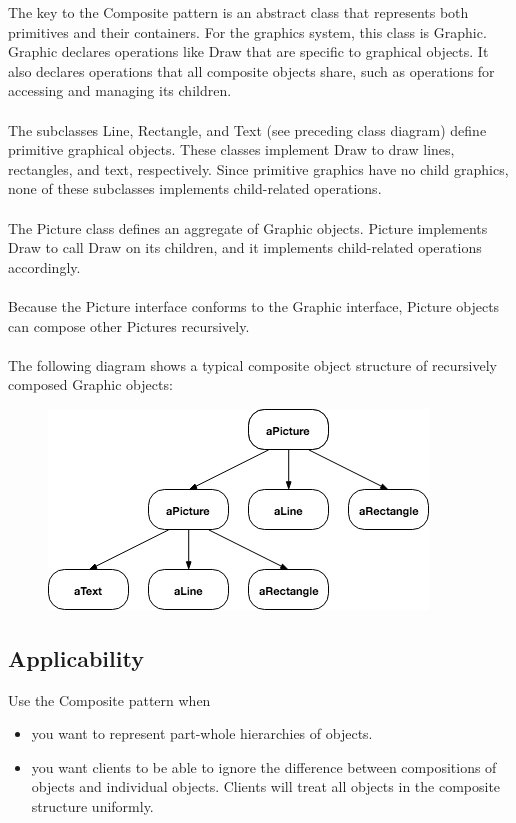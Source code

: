 The key to the Composite pattern is an abstract class that represents both primitives and their containers. For the graphics system, this class is Graphic. Graphic declares operations like Draw that are specific to graphical objects. It also declares operations that all composite objects share, such as operations for accessing and managing its children.
\\\\
The subclasses Line, Rectangle, and Text (see preceding class diagram) define primitive graphical objects. These classes implement Draw to draw lines, rectangles, and text, respectively. Since primitive graphics have no child graphics, none of these subclasses implements child-related operations.
\\\\
The Picture class defines an aggregate of Graphic objects. Picture implements Draw to call Draw on its children, and it implements child-related operations accordingly.
\\\\
Because the Picture interface conforms to the Graphic interface, Picture objects can compose other Pictures recursively.
\\\\
The following diagram shows a typical composite object structure of recursively composed Graphic objects:

\begin{figure}[H]
\centering
\includegraphics[scale=0.7]{diagrams/composite_motivation_s.png}
\end{figure}

\subsection*{Applicability}

Use the Composite pattern when
\begin{itemize}
    \item you want to represent part-whole hierarchies of objects.
    \item you want clients to be able to ignore the difference between compositions of objects and individual objects. Clients will treat all objects in the composite structure uniformly.
\end{itemize}

